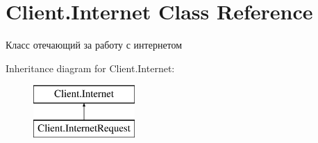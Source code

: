 \hypertarget{class_client_1_1_internet}{}\section{Client.\+Internet Class Reference}
\label{class_client_1_1_internet}


Класс отечающий за работу с интернетом  


Inheritance diagram for Client.\+Internet\+:\begin{figure}[H]
\begin{center}
\leavevmode
\includegraphics[height=2.000000cm]{class_client_1_1_internet}
\end{center}
\end{figure}
